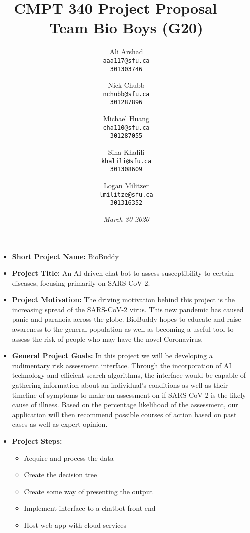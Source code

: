 \documentclass{article}
\title{CMPT 340 Project Proposal --- Team Bio Boys (G20)}
\author {
      Ali Arshad\\
      \texttt{aaa117@sfu.ca}\\
      \texttt{301303746}
      \and
      Nick Chubb\\
      \texttt{nchubb@sfu.ca}\\
      \texttt{301287896}
      \and
      Michael Huang\\
      \texttt{cha110@sfu.ca}\\
      \texttt{301287055}
      \and
      Sina Khalili\\
      \texttt{khalili@sfu.ca}\\
      \texttt{301308609}
      \and
      Logan Militzer\\
      \texttt{lmilitze@sfu.ca}\\
      \texttt{301316352}
    }
\date{\emph{\vfill{March 30 2020}}}
\begin{document}
\maketitle
\thispagestyle{empty}

\newpage


\begin{itemize}
    \item \textbf{Short Project Name:} BioBuddy
    
    \item \textbf{Project Title:} An AI driven chat-bot to assess susceptibility to certain diseases, focusing primarily on SARS-CoV-2. 
    
    \item \textbf{Project Motivation:} The driving motivation behind this project is the increasing spread of the SARS-CoV-2 virus. This new pandemic has caused panic and paranoia across the globe. BioBuddy hopes to educate and raise awareness to the general population as well as becoming a useful tool to assess the risk of people who may have the novel Coronavirus.
    
    \item \textbf{General Project Goals:} In this project we will be developing a rudimentary risk assessment interface. Through the incorporation of AI technology and efficient search algorithms, the interface would be capable of gathering information about an individual’s conditions as well as their timeline of symptoms to make an assessment on if SARS-CoV-2 is the likely cause of illness. Based on the percentage likelihood of the assessment, our application will then recommend possible courses of action based on past cases as well as expert opinion.  
    
    \item \textbf{Project Steps:}
    \begin{itemize}
    \item Acquire and process the data
    \item Create the decision tree 
    \item Create some way of presenting the output 
    \item Implement interface to a chatbot front-end 
    \item Host web app with cloud services
    \end{itemize}
    

\end{itemize}
\end{document}
